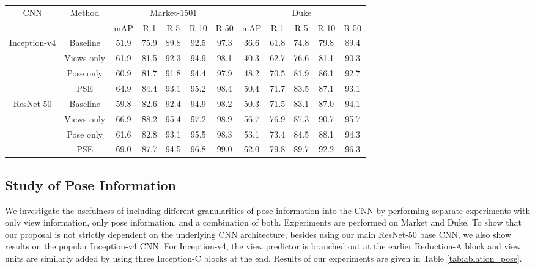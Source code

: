 \documentclass[10pt,twocolumn,letterpaper]{article}
\begin{document}
\begin{table*}[htb]
\centering
\begin{tabular}{ | c | c | ccccc | ccccc |} 
    \hline
	CNN & Method & \multicolumn{5}{|c|}{Market-1501} & \multicolumn{5}{|c|}{Duke}  \\
	                           & &      mAP & R-1 & R-5 & R-10 & R-50  &    mAP & R-1 & R-5 & R-10 & R-50 \\
	\hline\hline
    Inception-v4 & Baseline   &     51.9 &     75.9 &  89.8	& 92.5 & 97.3 &    36.6 &     61.8 & 74.8&	79.8	& 89.4  \\
	             & Views only &     61.9 &     81.5  &  92.3	& 94.9	& 98.1 &     40.3 &     62.7   & 76.6&	81.1	& 90.3 \\
		         & Pose only  &     60.9 &     81.7  &  91.8	&94.4 &	97.9  &     48.2 &     70.5  & 81.9 &	86.1&	92.7   \\
                 & PSE        & \f{64.9} & \f{84.4}   & \f{93.1}	&\f{95.2} &	\f{98.4} & \f{50.4} & \f{71.7}   & \f{83.5}	& \f{87.1} &	\f{93.1} \\
	\hline
	ResNet-50    & Baseline   &     59.8 &     82.6 &  92.4	& 94.9 &	98.2  &       50.3 &     71.5   &83.1&	87.0	& 94.1  \\
           		 & Views only &     66.9 & \f{88.2} &   \f{ 95.4}	& \f{97.2}	& 98.9  &     56.7 &     76.9  &  87.3&	90.7	& 95.7    \\
		   		 & Pose only  &     61.6 &     82.8 &   93.1	& 95.5	& 98.3  &      53.1 &     73.4  &  84.5	&88.1 &	94.3  \\
           		 & PSE		  & \f{69.0} &     87.7 &  94.5	& 96.8 &	\f{99.0}  &    \f{62.0} & \f{79.8}  &  \f{89.7} & \f{92.2} & \f{96.3}\\
	\hline
\end{tabular}
\vspace{.1cm}
\caption{Comparison of different types of pose information. While views and full body pose individually lead to notable improvements, a combination of both often results in further improvements.}
\label{tab:ablation_pose}
\vspace{-.2cm}
\end{table*}
\subsection{Study of Pose Information}
\label{sec:eval-pse}
We investigate the usefulness of including different granularities of
pose information into the CNN by performing separate experiments with only view information, 
only pose information, and a combination of both. Experiments are performed on Market and Duke. To show that our proposal is not strictly dependent on the underlying CNN architecture, besides using our main ResNet-50 base CNN, we also show results on the popular Inception-v4 CNN. For Inception-v4, the view predictor is branched out at the earlier Reduction-A block and view units are similarly added by using three Inception-C blocks at the end. Results of
our experiments are given in Table \ref{tab:ablation_pose}.
\end{document}
